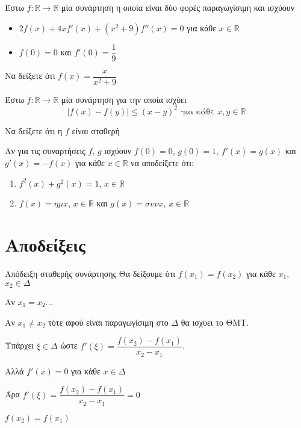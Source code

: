 \documentclass{presentation}
\begin{document}
\begin{askisi}
  Έστω $f:\mathbb{R}\to\mathbb{R}$ μία συνάρτηση η οποία είναι δύο φορές παραγωγίσιμη και ισχύουν
  \begin{itemize}
    \item $2f(x)+4xf'(x)+(x^2+9)f''(x)=0$ για κάθε $x\in\mathbb{R}$
    \item $f(0)=0$ και $f'(0)=\dfrac{1}{9}$
  \end{itemize}

  Να δείξετε ότι $f(x)=\dfrac{x}{x^2+9}$

\end{askisi}

\begin{askisi}
  Έστω $f:\mathbb{R}\to\mathbb{R}$ μία συνάρτηση για την οποία ισχύει
  $$|f(x)-f(y)|\le (x-y)^2 \text{ για κάθε } x,y\in\mathbb{R}$$

  Να δείξετε ότι η $f$ είναι σταθερή

\end{askisi}

\begin{askisi}
  Αν για τις συναρτήσεις $f$, $g$ ισχύουν $f(0)=0$, $g(0)=1$, $f'(x)=g(x)$ και $g'(x)=-f(x)$ για κάθε $x\in\mathbb{R}$ να αποδείξετε ότι:
  \begin{enumerate}
    \item<1-> $f^2(x)+g^2(x)=1$, $x\in\mathbb{R}$
    \item<2-> $f(x)=ημx$, $x\in\mathbb{R}$ και $g(x)=συνx$, $x\in\mathbb{R}$
  \end{enumerate}

\end{askisi}


\appendix

\section{Αποδείξεις}
\begin{frame}{Απόδειξη σταθερής συνάρτησης}
  Θα δείξουμε ότι $f(x_1)=f(x_2)$ για κάθε $x_1$, $x_2\in Δ$

   Αν $x_1=x_2$...

   Αν $x_1\ne x_2$ τότε αφού είναι παραγωγίσιμη στο $Δ$ θα ισχύει το ΘΜΤ.

   Υπάρχει $ξ\in Δ$ ώστε $f'(ξ)=\dfrac{f(x_2)-f(x_1)}{x_2-x_1}$.

   Αλλά $f'(x)=0$ για κάθε $x\in Δ$

   Άρα $f'(ξ)=\dfrac{f(x_2)-f(x_1)}{x_2-x_1}=0$

   $f(x_2)=f(x_1)$
\end{frame}
\end{document}
